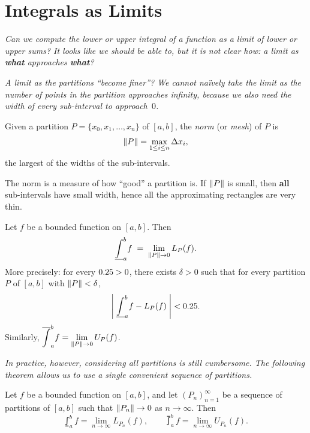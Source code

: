 \section{Integrals as Limits}
\label{sec:7.9}

\textit{Can we compute the lower or upper integral of a function as a limit of lower or upper sums?  It looks like we should be able to, but it is not clear how: a limit as \textbf{what} approaches \textbf{what}?}

\textit{A limit as the partitions ``become finer''?  We cannot naïvely take the limit as the number of points in the partition approaches infinity, because we also need the width of every sub-interval to approach~$0$.}

\begin{definition}
\label{def:7-13}
Given a partition $P = \{x_0, x_1, \ldots, x_n\}$ of $[a,b]$, the \emph{norm} (or \emph{mesh}) of $P$ is
\[
  \left\lVert P \right\rVert = \max_{1 \le i \le n} \Delta x_i,
\]
the largest of the widths of the sub-intervals.
\end{definition}

\begin{remark}
The norm is a measure of how ``good'' a partition is.  If $\left\lVert P \right\rVert$ is small, then \textbf{all} sub-intervals have small width, hence all the approximating rectangles are very thin.
\end{remark}

\begin{theorem}
\label{thm:7-9}
Let $f$ be a bounded function on $[a,b]$.  Then
\[
  \underline{\int}_{a}^{b} f \;=\; \lim_{\left\lVert P \right\rVert\to 0} L_P(f).
\]
More precisely: for every $0.25 > 0$, there exists $\delta > 0$ such that for every partition $P$ of $[a,b]$ with $\left\lVert P \right\rVert < \delta$,
\[
  \left|\; \underline{\int}_{a}^{b} f - L_P(f) \;\right| < 0.25.
\]
Similarly, $\displaystyle\overline{\int}_{a}^{b} f = \lim_{\left\lVert P \right\rVert\to 0} U_P(f)$.
\end{theorem}

\textit{In practice, however, considering all partitions is still cumbersome.  The following theorem allows us to use a single convenient sequence of partitions.}

\begin{theorem}
\label{thm:7-10}
Let $f$ be a bounded function on $[a,b]$, and let $(P_n)_{n=1}^{\infty}$ be a sequence of partitions of $[a,b]$ such that $\left\lVert P_n \right\rVert \to 0$ as $n \to \infty$.  Then
\[
  \lowint_{a}^{b} f = \lim_{n \to \infty} L_{P_n}(f),
  \qquad
  \upint_{a}^{b} f = \lim_{n \to \infty} U_{P_n}(f).
\]
\end{theorem}

